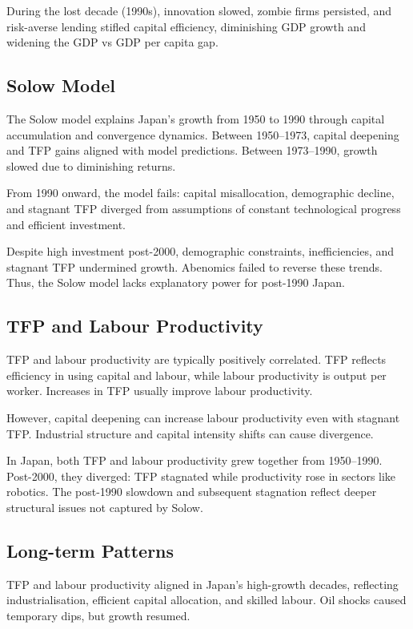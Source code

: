 During the lost decade (1990s), innovation slowed, zombie firms persisted, and risk-averse lending stifled capital efficiency, diminishing GDP growth and widening the GDP vs GDP per capita gap.

\subsection*{Solow Model}
The Solow model explains Japan's growth from 1950 to 1990 through capital accumulation and convergence dynamics. Between 1950--1973, capital deepening and TFP gains aligned with model predictions. Between 1973--1990, growth slowed due to diminishing returns.

From 1990 onward, the model fails: capital misallocation, demographic decline, and stagnant TFP diverged from assumptions of constant technological progress and efficient investment.

Despite high investment post-2000, demographic constraints, inefficiencies, and stagnant TFP undermined growth. Abenomics failed to reverse these trends. Thus, the Solow model lacks explanatory power for post-1990 Japan.

\subsection*{TFP and Labour Productivity}
TFP and labour productivity are typically positively correlated. TFP reflects efficiency in using capital and labour, while labour productivity is output per worker. Increases in TFP usually improve labour productivity.

However, capital deepening can increase labour productivity even with stagnant TFP. Industrial structure and capital intensity shifts can cause divergence.

In Japan, both TFP and labour productivity grew together from 1950--1990. Post-2000, they diverged: TFP stagnated while productivity rose in sectors like robotics. The post-1990 slowdown and subsequent stagnation reflect deeper structural issues not captured by Solow.

\subsection*{Long-term Patterns}
TFP and labour productivity aligned in Japan's high-growth decades, reflecting industrialisation, efficient capital allocation, and skilled labour. Oil shocks caused temporary dips, but growth resumed.

